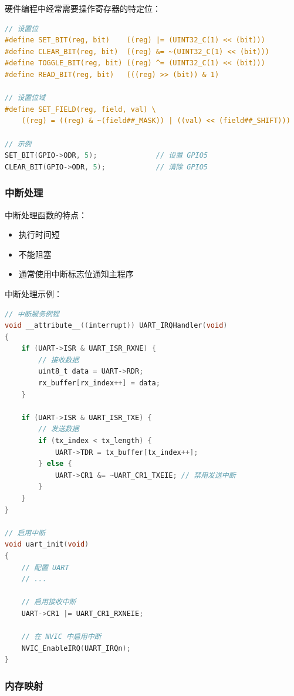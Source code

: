 硬件编程中经常需要操作寄存器的特定位：

\begin{lstlisting}[language=C]
// 设置位
#define SET_BIT(reg, bit)    ((reg) |= (UINT32_C(1) << (bit)))
#define CLEAR_BIT(reg, bit)  ((reg) &= ~(UINT32_C(1) << (bit)))
#define TOGGLE_BIT(reg, bit) ((reg) ^= (UINT32_C(1) << (bit)))
#define READ_BIT(reg, bit)   (((reg) >> (bit)) & 1)

// 设置位域
#define SET_FIELD(reg, field, val) \
    ((reg) = ((reg) & ~(field##_MASK)) | ((val) << (field##_SHIFT)))

// 示例
SET_BIT(GPIO->ODR, 5);              // 设置 GPIO5
CLEAR_BIT(GPIO->ODR, 5);            // 清除 GPIO5
\end{lstlisting}

\subsubsection{中断处理}


中断处理函数的特点：
\begin{itemize}
  \item 执行时间短
  \item 不能阻塞
  \item 通常使用中断标志位通知主程序
\end{itemize}

中断处理示例：
\begin{lstlisting}[language=C]
// 中断服务例程
void __attribute__((interrupt)) UART_IRQHandler(void)
{
    if (UART->ISR & UART_ISR_RXNE) {
        // 接收数据
        uint8_t data = UART->RDR;
        rx_buffer[rx_index++] = data;
    }

    if (UART->ISR & UART_ISR_TXE) {
        // 发送数据
        if (tx_index < tx_length) {
            UART->TDR = tx_buffer[tx_index++];
        } else {
            UART->CR1 &= ~UART_CR1_TXEIE; // 禁用发送中断
        }
    }
}

// 启用中断
void uart_init(void)
{
    // 配置 UART
    // ...

    // 启用接收中断
    UART->CR1 |= UART_CR1_RXNEIE;

    // 在 NVIC 中启用中断
    NVIC_EnableIRQ(UART_IRQn);
}
\end{lstlisting}

\subsubsection{内存映射}

